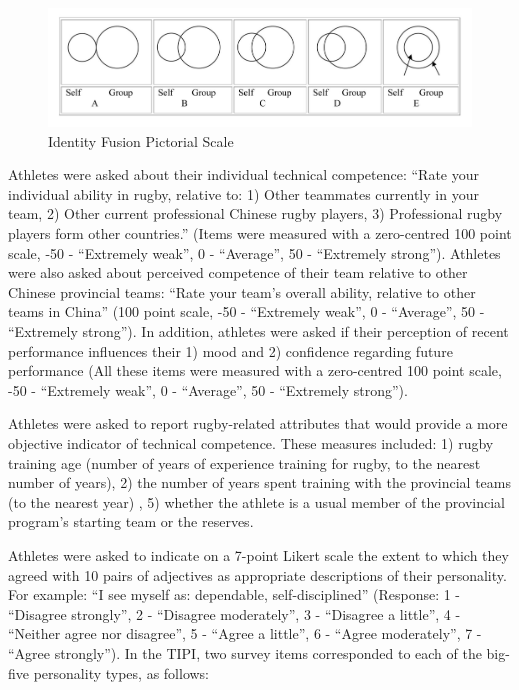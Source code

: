   \begin{figure}[htbp]
    \includegraphics[width=\linewidth]{images/Identity_Fusion_Pictorial_Scale.png}
    \caption{Identity Fusion Pictorial Scale}
    \label{fig:fusionPictorialGroup}
  \end{figure}


Athletes were asked about their individual technical competence: ``Rate your individual ability in rugby, relative to: 1) Other teammates currently in your team, 2) Other current professional Chinese rugby players, 3) Professional rugby players form other countries.'' (Items were measured with a zero-centred 100 point scale, -50 - ``Extremely weak'', 0 - ``Average'', 50 - ``Extremely strong'').  Athletes were also asked about perceived competence of their team relative to other Chinese provincial teams: ``Rate your team's overall ability, relative to other teams in China'' (100 point scale, -50 - ``Extremely weak'', 0 - ``Average'', 50 - ``Extremely strong'').  In addition, athletes were asked if their perception of recent performance influences their 1) mood and 2) confidence regarding future performance (All these items were measured with a zero-centred 100 point scale, -50 - ``Extremely weak'', 0 - ``Average'', 50 - ``Extremely strong'').

Athletes were asked to report rugby-related attributes that would provide a more objective indicator of technical competence. These measures included: 1) rugby training age (number of years of experience training for rugby, to the nearest number of years), 2) the number of years spent training with the provincial teams (to the nearest year) , 5) whether the athlete is a usual member of the provincial program's starting team or the reserves.


Athletes were asked to indicate on a 7-point Likert scale the extent to which they agreed with 10 pairs of adjectives as appropriate descriptions of their personality. For example: ``I see myself as: dependable, self-disciplined'' (Response: 1 - ``Disagree strongly'', 2 - ``Disagree moderately'',  3 - ``Disagree a little'', 4 - ``Neither agree nor disagree'', 5 - ``Agree a little'', 6 - ``Agree moderately'', 7 - ``Agree strongly''). In the TIPI, two survey items corresponded to each of the big-five personality types, as follows:

